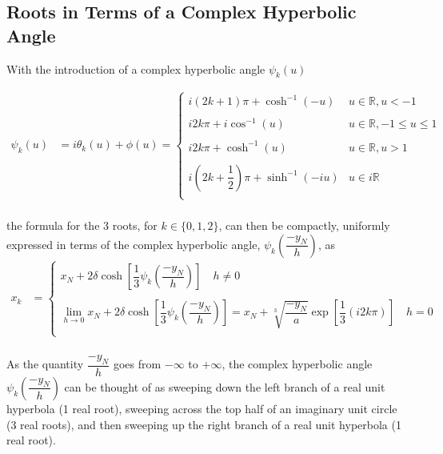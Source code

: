 \documentclass{article}
\begin{document}
\subsection{Roots in Terms of a Complex Hyperbolic Angle}
With the introduction of a complex hyperbolic angle \mbox{$\psi_k(u)$}

\begin{align*}
	\psi_k(u) &= i\theta_k(u)+ \phi(u)= \begin{cases}
		i(2k+1)\pi + \cosh^{-1}(-u) &  u \in \mathbb{R}, u < -1\\
		\\
		i2k\pi + i\cos^{-1}(u) & u \in \mathbb{R}, -1 \le u \le 1\\
		\\
		i2k\pi + \cosh^{-1}(u) &  u \in \mathbb{R}, u > 1\\
		\\
		i\left(2k+\dfrac{1}{2}\right)\pi + \sinh^{-1}(-iu) &  u \in i\mathbb{R}\\
	\end{cases} \\
\end{align*}

\noindent
the formula for the 3 roots, for \mbox{$k \in \{0, 1, 2\}$}, can then be compactly, uniformly expressed in terms of the complex hyperbolic angle, \mbox{$\psi_k\left(\dfrac{-y_N}{h}\right)$}, as
\begin{align*} 
	x_k &= \begin{cases}
		x_N + 2\delta\cosh\left[\dfrac{1}{3}\psi_k\left(\dfrac{-y_N}{h}\right)\right] \quad h \ne 0\\
		\\
		\lim_{h \to 0} x_N + 2\delta\cosh\left[\dfrac{1}{3}\psi_k\left(\dfrac{-y_N}{h}\right)\right] =  x_N + \sqrt[3]{\dfrac{-y_N}{a}}\exp\left[\dfrac{1}{3}\left(i2k\pi\right)\right] \quad h = 0 \\
	\end{cases} \\
\end{align*}

As the quantity \mbox{$\dfrac{-y_N}{h}$} goes from \mbox{$-\infty$} to \mbox{$+\infty$}, the complex hyperbolic angle \mbox{$\psi_k\left(\dfrac{-y_N}{h}\right)$} can be thought of as sweeping down the left branch of a real unit hyperbola (1 real root), sweeping across the top half of an imaginary unit circle (3 real roots), and then sweeping up the right branch of a real unit hyperbola (1 real root).
\end{document}
